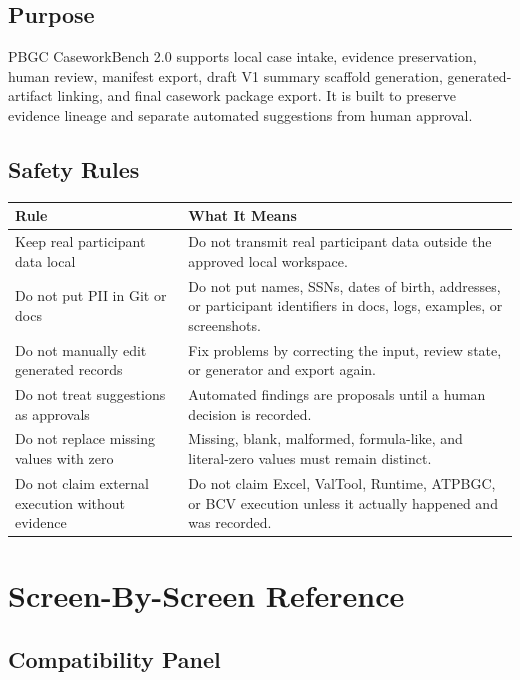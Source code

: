 \section{Purpose}

PBGC CaseworkBench 2.0 supports local case intake, evidence preservation, human review, manifest export, draft V1 summary scaffold generation, generated-artifact linking, and final casework package export. It is built to preserve evidence lineage and separate automated suggestions from human approval.

\section{Safety Rules}

\begin{longtable}{L{0.34\textwidth}L{0.56\textwidth}}
\toprule
\textbf{Rule} & \textbf{What It Means} \\
\midrule
Keep real participant data local & Do not transmit real participant data outside the approved local workspace. \\
Do not put PII in Git or docs & Do not put names, SSNs, dates of birth, addresses, or participant identifiers in docs, logs, examples, or screenshots. \\
Do not manually edit generated records & Fix problems by correcting the input, review state, or generator and export again. \\
Do not treat suggestions as approvals & Automated findings are proposals until a human decision is recorded. \\
Do not replace missing values with zero & Missing, blank, malformed, formula-like, and literal-zero values must remain distinct. \\
Do not claim external execution without evidence & Do not claim Excel, ValTool, Runtime, ATPBGC, or BCV execution unless it actually happened and was recorded. \\
\bottomrule
\end{longtable}

\chapter{Screen-By-Screen Reference}

\section{Compatibility Panel}

